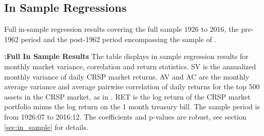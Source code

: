 \subsection{In Sample Regressions}
Full in-sample regression results covering the full sample 1926 to 2016, the pre-1962 period and the post-1962 period encompassing the sample of \citet{pollet_average_2010}.
\begin{table}
	\centering \caption{\textbf{:Full In Sample Results} \newline
		\footnotesize{The table displays in sample regression results for monthly market variance, correlation and return statistics. SV is the annualized monthly variance of daily CRSP market returns. AV and AC are the monthly average variance and average pairwise correlation of daily returns for the top 500 assets in the CRSP market, as in \citet{pollet_average_2010}. RET is the log return of the CRSP market portfolio minus the log return on the 1 month treasury bill. The sample period is from 1926:07 to 2016:12. The coefficients and p-values are robust, see section \ref{sec:in_sample} for details.}} \vspace{-3mm}
	\label{tab:tab_in_sample_full_app}
	\vspace{-3mm}
	\begin{adjustbox}{center,max height=.45\totalheight}
		
	\end{adjustbox}
	\vspace{-3mm}
	\begin{adjustbox}{center,max height=.45\totalheight}
		
	\end{adjustbox}
	\vspace{-3mm}
	\begin{adjustbox}{center,max height=.45\totalheight}
		
	\end{adjustbox}
	\vspace{-3mm}
	\begin{adjustbox}{center,max height=.45\totalheight}
		
	\end{adjustbox}
\end{table}
\clearpage
